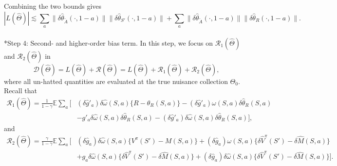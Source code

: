 \documentclass[12pt]{article}
\makeatletter
\let\oldparagraph\paragraph
\renewcommand{\paragraph}{
        \@ifstar
            \xxxParagraphStar
            \xxxParagraphNoStar
    }
\newcommand{\xxxParagraphStar}[1]{\oldparagraph*{#1}\mbox{}}
\newcommand{\xxxParagraphNoStar}[1]{\oldparagraph{#1}\mbox{}}
\newcommand{\0}{\boldsymbol{0}}
\newcommand{\E}{\mathbb{E}}
\makeatother
\begin{document}
Combining the two bounds gives
\[
|L(\widehat\Theta)|\lesssim\sum_a\|\delta \widehat \theta_{\widetilde A}(\cdot,1-a)\|
\|\delta \widehat \theta_{S'}(\cdot,1-a)\|+\sum_a\|\delta \widehat \theta_{\widetilde A}(\cdot,1-a)\|\|\delta \widehat \theta_R(\cdot,1-a)\|.
\]


\paragraph*{Step 4: Second- and higher-order bias term.}
In this step, we focus on $\mathcal R_1(\widehat\Theta)$ and $\mathcal R_2(\widehat\Theta)$ in
\[
\mathcal D(\widehat\Theta)= L(\widehat\Theta) + \mathcal R(\widehat\Theta)
=L(\widehat\Theta) +  \mathcal R_1(\widehat\Theta)+\mathcal R_2(\widehat\Theta),
\]
where all un-hatted quantities are evaluated at the true nuisance collection
\(\Theta_0\). Recall that
\[
\begin{aligned}
\mathcal R_1(\widehat\Theta)
=\frac{1}{1-\gamma}\E\sum_a\Big[
&(\delta \widehat g'_a)\delta \widehat \omega(S,a)\{R-\theta_R(S,a)\}-(\delta \widehat g'_a)\omega(S,a)\delta \widehat \theta_R(S,a) \\
&-g'_a\delta \widehat \omega(S,a)\delta \widehat \theta_R(S,a)-(\delta \widehat g'_a)\delta \widehat \omega(S,a)\delta \widehat \theta_R(S,a)\Big],
\end{aligned}
\]
and
\[
\begin{aligned}
\mathcal R_2(\widehat\Theta)=\frac{\gamma}{1-\gamma}\E\sum_a
\Big[
&(\delta \widehat g_a)\delta \widehat \omega(S,a)\{V^\pi(S')-M(S,a)\} +(\delta \widehat g_a)\omega(S,a)\{\delta \widehat V^\pi(S')-\delta \widehat M(S,a)\} \\
&+g_a\delta \widehat \omega(S,a)\{\delta \widehat V^\pi(S')-\delta \widehat M(S,a)\} +(\delta \widehat g_a)\delta \widehat \omega(S,a)\{\delta \widehat V^\pi(S')-\delta \widehat M(S,a)\}\Big].
\end{aligned}
\]
\end{document}
